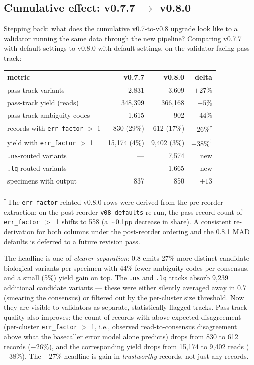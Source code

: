 \documentclass[11pt]{article}
\begin{document}
\subsection{Cumulative effect: v0.7.7 \texorpdfstring{$\to$}{->} v0.8.0}
\label{sec:results-version}

Stepping back: what does the cumulative v0.7-to-v0.8 upgrade look like
to a validator running the same data through the new pipeline? Comparing
v0.7.7 with default settings to v0.8.0 with default settings, on the
validator-facing pass track:

\begin{center}
\begin{tabular}{lrrr}
\toprule
metric & v0.7.7 & v0.8.0 & delta \\
\midrule
pass-track variants & 2,831 & 3,609 & \textbf{$+27\%$} \\
pass-track yield (reads) & 348,399 & 366,168 & \textbf{$+5\%$} \\
pass-track ambiguity codes & 1,615 & 902 & \textbf{$-44\%$} \\
records with \texttt{err\_factor} $>$ 1 & 830 (29\%) & 612 (17\%) & \textbf{$-26\%$}\textsuperscript{$\dagger$} \\
yield with \texttt{err\_factor} $>$ 1 & 15,174 (4\%) & 9,402 (3\%) & \textbf{$-38\%$}\textsuperscript{$\dagger$} \\
\texttt{.ns}-routed variants & --- & 7,574 & new \\
\texttt{.lq}-routed variants & --- & 1,665 & new \\
specimens with output & 837 & 850 & $+13$ \\
\bottomrule
\end{tabular}
\end{center}

\noindent\textsuperscript{$\dagger$}\,The \texttt{err\_factor}-related
v0.8.0 rows were derived from the pre-reorder extraction; on the
post-reorder \texttt{v08-defaults} re-run, the pass-record count of
\texttt{err\_factor}~$>$~1 shifts to 558 (a $\sim$0.1pp decrease in
share). A consistent re-derivation for both columns under the
post-reorder ordering and the 0.8.1 MAD defaults is deferred to a
future revision pass.

The headline is one of \emph{clearer separation}: 0.8 emits 27\% more
distinct candidate biological variants per specimen with 44\% fewer ambiguity
codes per consensus, and a small (5\%) yield gain on top. The
\texttt{.ns} and \texttt{.lq} tracks absorb 9,239 additional candidate
variants --- these were either silently averaged away in 0.7 (smearing
the consensus) or filtered out by the per-cluster size threshold. Now
they are visible to validators as separate, statistically-flagged
tracks. Pass-track quality also improves: the count of records with
above-expected disagreement (per-cluster \texttt{err\_factor} $>$ 1,
i.e., observed read-to-consensus disagreement above what the
basecaller error model alone predicts) drops from 830 to 612 records
($-26\%$), and the corresponding yield drops from 15,174 to 9,402
reads ($-38\%$). The $+27\%$ headline is gain in \emph{trustworthy}
records, not just any records.
\end{document}
